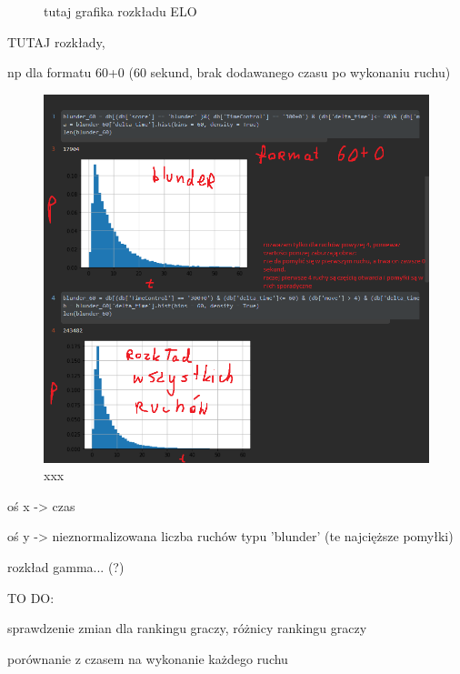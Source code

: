 \documentclass[inzynierska]{pwr_wmat_praca_dyplomowa}
\theoremstyle{plain}
\numberwithin{theorem}{chapter}
\theoremstyle{definition}
\numberwithin{theorem}{chapter}
\begin{document}
\begin{figure}[H]
	\centering
	\caption{tutaj grafika rozkładu ELO}
	\label{rys:rozklad_elo}
\end{figure}





TUTAJ rozkłady, 

np dla formatu 60+0 (60 sekund, brak dodawanego czasu po wykonaniu ruchu)

\begin{figure}[H]
	\centering
	\includegraphics[width=\textwidth]{sample60.png}
	\caption{xxx}\label{xxx}
\end{figure}


oś x -> czas

oś y -> nieznormalizowana liczba ruchów typu 'blunder' (te najcięższe pomyłki)\newline


rozkład gamma... (?)\newline 




TO DO: 

sprawdzenie zmian dla rankingu graczy, różnicy rankingu graczy

porównanie z czasem na wykonanie każdego ruchu\newline
\end{document}
